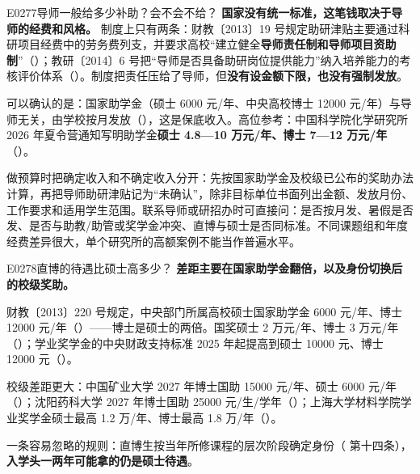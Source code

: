 \begin{qa}{E0277}{导师一般给多少补助？会不会不给？}
\textbf{国家没有统一标准，这笔钱取决于导师的经费和风格。} 制度上只有两条：财教〔2013〕19 号规定助研津贴主要通过科研项目经费中的劳务费列支，并要求高校“建立健全\textbf{导师责任制和导师项目资助制}”（）；教研〔2014〕6 号把“导师是否具备助研岗位提供能力”纳入培养能力的考核评价体系（）。制度把责任压给了导师，但\textbf{没有设金额下限，也没有强制发放}。

可以确认的是：国家助学金（硕士 6000 元/年、中央高校博士 12000 元/年）与导师无关，由学校按月发放（），这是保底收入。高位参考：中国科学院化学研究所 2026 年夏令营通知写明助学金\textbf{硕士 4.8—10 万元/年、博士 7—12 万元/年}（）。

做预算时把确定收入和不确定收入分开：先按国家助学金及校级已公布的奖助办法计算，再把导师助研津贴记为“未确认”，除非目标单位书面列出金额、发放月份、工作要求和适用学生范围。联系导师或研招办时可直接问：是否按月发、暑假是否发、是否与助教/助管或奖学金冲突、直博与硕士是否同标准。不同课题组和年度经费差异很大，单个研究所的高额案例不能当作普遍水平。
\end{qa}

\begin{qa}{E0278}{直博的待遇比硕士高多少？}
\textbf{差距主要在国家助学金翻倍，以及身份切换后的校级奖助。}

财教〔2013〕220 号规定，中央部门所属高校硕士国家助学金 6000 元/年、博士 12000 元/年（）——博士是硕士的两倍。国奖硕士 2 万元/年、博士 3 万元/年（）；学业奖学金的中央财政支持标准 2025 年起提高到硕士 10000 元、博士 12000 元（）。

校级差距更大：中国矿业大学 2027 年博士国助 15000 元/年、硕士 6000 元/年（）；沈阳药科大学 2027 年博士国助 25000 元/生/学年（）；上海大学材料学院学业奖学金硕士最高 1.2 万/年、博士最高 1.8 万/年（）。

一条容易忽略的规则：直博生按当年所修课程的层次阶段确定身份（ 第十四条），\textbf{入学头一两年可能拿的仍是硕士待遇}。
\end{qa}

